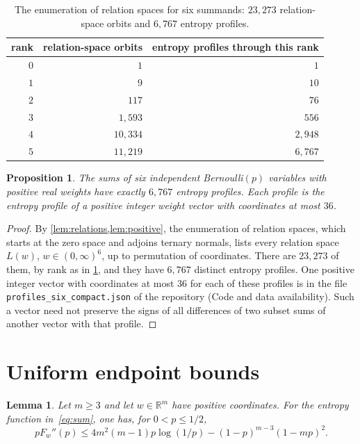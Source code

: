 \documentclass[11pt,a4paper]{article}
\numberwithin{equation}{section}
\newtheorem{lemma}[theorem]{Lemma}
\newtheorem{proposition}[theorem]{Proposition}
\theoremstyle{remark}
\newcommand{\R}{\mathbb R}
\begin{document}
\begin{table}[ht]
\centering
\begin{tabular}{rrr}
\toprule
rank & relation-space orbits & entropy profiles through this rank\\
\midrule
$0$ & $1$ & $1$\\
$1$ & $9$ & $10$\\
$2$ & $117$ & $76$\\
$3$ & $1{,}593$ & $556$\\
$4$ & $10{,}334$ & $2{,}948$\\
$5$ & $11{,}219$ & $6{,}767$\\
\bottomrule
\end{tabular}
\caption{The enumeration of relation spaces for six summands: $23{,}273$ relation-space orbits and $6{,}767$ entropy profiles.}\label{tab:six}
\end{table}

\begin{proposition}\label{prop:sixprofiles}
The sums of six independent Bernoulli$(p)$ variables with positive real weights have exactly $6{,}767$ entropy profiles. Each profile is the entropy profile of a positive integer weight vector with coordinates at most $36$.
\end{proposition}
\begin{proof}
By \cref{lem:relations,lem:positive}, the enumeration of relation spaces, which starts at the zero space and adjoins ternary normals, lists every relation space $L(w)$, $w\in(0,\infty)^6$, up to permutation of coordinates. There are $23{,}273$ of them, by rank as in \cref{tab:six}, and they have $6{,}767$ distinct entropy profiles. One positive integer vector with coordinates at most $36$ for each of these profiles is in the file \texttt{profiles\_six\_compact.json} of the repository (Code and data availability). Such a vector need not preserve the signs of all differences of two subset sums of another vector with that profile.
\end{proof}


\section{Uniform endpoint bounds}\label{sec:endpoint}

\begin{lemma}\label{lem:endpoint}
Let $m\ge3$ and let $w\in\R^m$ have positive coordinates. For the entropy function in~\eqref{eq:sum}, one has, for $0<p\le1/2$,
\begin{equation}\label{eq:endpoint}
 pF_w''(p)\le4m^2(m-1)p\log(1/p)
              -(1-p)^{m-3}(1-mp)^2.
\end{equation}
\end{lemma}
\end{document}
